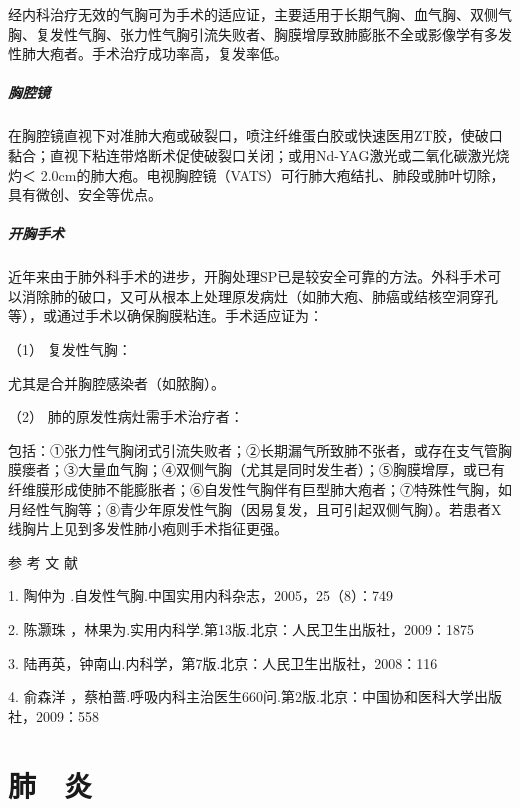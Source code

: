 经内科治疗无效的气胸可为手术的适应证，主要适用于长期气胸、血气胸、双侧气胸、复发性气胸、张力性气胸引流失败者、胸膜增厚致肺膨胀不全或影像学有多发性肺大疱者。手术治疗成功率高，复发率低。

\paragraph{胸腔镜}

在胸腔镜直视下对准肺大疱或破裂口，喷注纤维蛋白胶或快速医用ZT胶，使破口黏合；直视下粘连带烙断术促使破裂口关闭；或用Nd-YAG激光或二氧化碳激光烧灼＜
2.0cm的肺大疱。电视胸腔镜（VATS）可行肺大疱结扎、肺段或肺叶切除，具有微创、安全等优点。

\paragraph{开胸手术}

近年来由于肺外科手术的进步，开胸处理SP已是较安全可靠的方法。外科手术可以消除肺的破口，又可从根本上处理原发病灶（如肺大疱、肺癌或结核空洞穿孔等），或通过手术以确保胸膜粘连。手术适应证为：

\hypertarget{text00270.htmlux5cux23CHP9-4-3-4-2-1}{}
（1） 复发性气胸：

尤其是合并胸腔感染者（如脓胸）。

\hypertarget{text00270.htmlux5cux23CHP9-4-3-4-2-2}{}
（2） 肺的原发性病灶需手术治疗者：

包括：①张力性气胸闭式引流失败者；②长期漏气所致肺不张者，或存在支气管胸膜瘘者；③大量血气胸；④双侧气胸（尤其是同时发生者）；⑤胸膜增厚，或已有纤维膜形成使肺不能膨胀者；⑥自发性气胸伴有巨型肺大疱者；⑦特殊性气胸，如月经性气胸等；⑧青少年原发性气胸（因易复发，且可引起双侧气胸）。若患者X线胸片上见到多发性肺小疱则手术指征更强。

\protect\hypertarget{text00271.html}{}{}

\hypertarget{text00271.htmlux5cux23CHP9-4-4}{}
参 考 文 献

1. 陶仲为 .自发性气胸.中国实用内科杂志，2005，25（8）：749

2. 陈灏珠 ，林果为.实用内科学.第13版.北京：人民卫生出版社，2009：1875

3. 陆再英，钟南山.内科学，第7版.北京：人民卫生出版社，2008：116

4. 俞森洋
，蔡柏蔷.呼吸内科主治医生660问.第2版.北京：中国协和医科大学出版社，2009：558

\protect\hypertarget{text00272.html}{}{}

\chapter{肺　炎}


